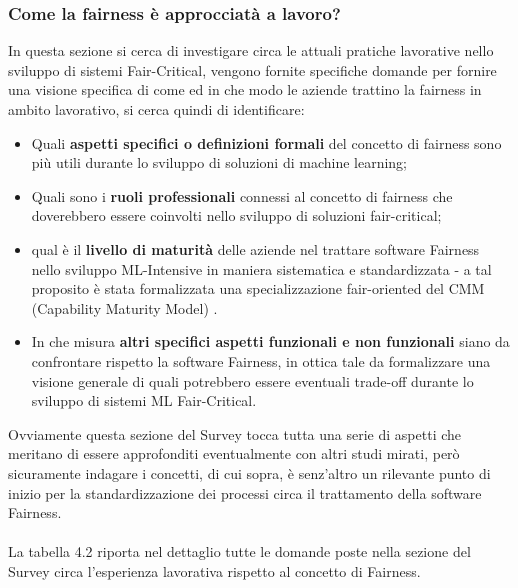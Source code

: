     
   \subsubsection{Come la fairness è approcciatà a lavoro?}
   
   In questa sezione si cerca di investigare circa le attuali pratiche lavorative nello sviluppo di sistemi Fair-Critical, vengono fornite specifiche domande per fornire una visione specifica di come ed in che modo le aziende trattino la fairness in ambito lavorativo, si cerca quindi di identificare:
   
   \begin{itemize}
       \item Quali \textbf{aspetti specifici o definizioni formali} del concetto di fairness sono più utili durante lo sviluppo di soluzioni di machine learning;
       \item Quali sono i \textbf{ruoli professionali} connessi al concetto di fairness che doverebbero essere coinvolti nello sviluppo di soluzioni fair-critical;
       \item qual è il \textbf{livello di maturità} delle aziende nel trattare software Fairness nello sviluppo ML-Intensive in maniera sistematica e standardizzata - a tal proposito è stata formalizzata una specializzazione fair-oriented del CMM (Capability Maturity Model) \cite{CMM}.
       \item In che misura \textbf{altri specifici aspetti funzionali e non funzionali} siano da confrontare rispetto la software Fairness, in ottica tale da formalizzare una visione generale di quali potrebbero essere eventuali trade-off durante lo sviluppo di sistemi ML Fair-Critical.
   \end{itemize}
   
   Ovviamente questa sezione del Survey tocca tutta una serie di aspetti che meritano di essere approfonditi eventualmente con altri studi mirati, però sicuramente indagare i concetti, di cui sopra, è senz'altro un rilevante punto di inizio per la standardizzazione dei processi circa il trattamento della software Fairness. \\\\
   
   La tabella 4.2 riporta nel dettaglio tutte le domande poste nella sezione del Survey circa l'esperienza lavorativa rispetto al concetto di Fairness.
   
